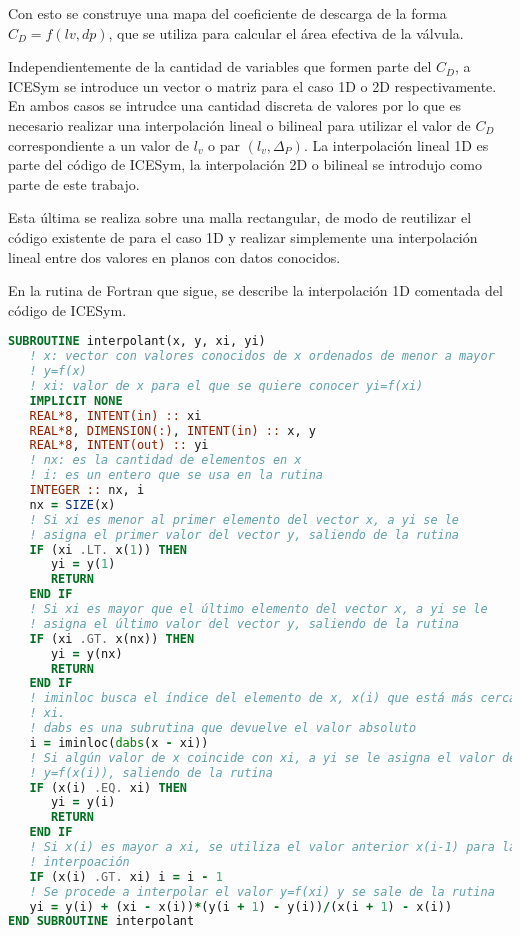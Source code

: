 Con esto se construye una mapa del coeficiente de descarga de la forma $C_D =
f(lv, dp)$, que se utiliza para calcular el área efectiva de la válvula.

Independientemente de la cantidad de variables que formen parte del $C_{D}$, a
ICESym se introduce un vector o matriz para el caso 1D o 2D respectivamente.
%
En ambos casos se intrudce una cantidad discreta de valores por lo que es
necesario realizar una interpolación lineal o bilineal para utilizar el valor de
$C_{D}$ correspondiente a un valor de $l_{v}$ o par $(l_{v}, \Delta_{P})$.
%
La interpolación lineal 1D es parte del código de ICESym, la interpolación 2D o
bilineal se introdujo como parte de este trabajo.

Esta última se realiza sobre una malla rectangular, de modo de reutilizar el
código existente de para el caso 1D y realizar  simplemente una interpolación
lineal entre dos valores en planos con datos conocidos.

En la rutina de Fortran que sigue, se describe la interpolación 1D comentada del
código de ICESym.

\begin{lstlisting}[basicstyle=\scriptsize, language=fortran, caption=Interpolación 1D]
SUBROUTINE interpolant(x, y, xi, yi)
   ! x: vector con valores conocidos de x ordenados de menor a mayor
   ! y=f(x)
   ! xi: valor de x para el que se quiere conocer yi=f(xi)
   IMPLICIT NONE
   REAL*8, INTENT(in) :: xi
   REAL*8, DIMENSION(:), INTENT(in) :: x, y
   REAL*8, INTENT(out) :: yi
   ! nx: es la cantidad de elementos en x
   ! i: es un entero que se usa en la rutina
   INTEGER :: nx, i
   nx = SIZE(x)
   ! Si xi es menor al primer elemento del vector x, a yi se le
   ! asigna el primer valor del vector y, saliendo de la rutina
   IF (xi .LT. x(1)) THEN
      yi = y(1)
      RETURN
   END IF
   ! Si xi es mayor que el último elemento del vector x, a yi se le
   ! asigna el último valor del vector y, saliendo de la rutina
   IF (xi .GT. x(nx)) THEN
      yi = y(nx)
      RETURN
   END IF
   ! iminloc busca el índice del elemento de x, x(i) que está más cercano a
   ! xi.
   ! dabs es una subrutina que devuelve el valor absoluto
   i = iminloc(dabs(x - xi))
   ! Si algún valor de x coincide con xi, a yi se le asigna el valor de
   ! y=f(x(i)), saliendo de la rutina
   IF (x(i) .EQ. xi) THEN
      yi = y(i)
      RETURN
   END IF
   ! Si x(i) es mayor a xi, se utiliza el valor anterior x(i-1) para la
   ! interpoación
   IF (x(i) .GT. xi) i = i - 1
   ! Se procede a interpolar el valor y=f(xi) y se sale de la rutina
   yi = y(i) + (xi - x(i))*(y(i + 1) - y(i))/(x(i + 1) - x(i))
END SUBROUTINE interpolant
\end{lstlisting}


